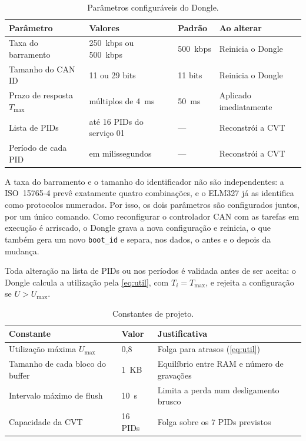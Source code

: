 \documentclass[12pt]{article}
\begin{document}
\begin{table}[htbp]
  \centering
  \caption{Parâmetros configuráveis do Dongle.}
  \label{tab:parametros}
  \begin{tabular}{llll}
    \toprule
    Parâmetro & Valores & Padrão & Ao alterar \\
    \midrule
    Taxa do barramento   & \SI{250}{kbps} ou \SI{500}{kbps} & \SI{500}{kbps} & Reinicia o Dongle \\
    Tamanho do CAN ID    & 11 ou 29 bits                     & 11 bits        & Reinicia o Dongle \\
    Prazo de resposta $T_{\max}$ & múltiplos de \SI{4}{\milli\second} & \SI{50}{\milli\second} & Aplicado imediatamente \\
    Lista de PIDs        & até 16 PIDs do serviço 01         & ---            & Reconstrói a CVT \\
    Período de cada PID  & em milissegundos                  & ---            & Reconstrói a CVT \\
    \bottomrule
  \end{tabular}
\end{table}
 
A taxa do barramento e o tamanho do identificador não são independentes: a ISO~15765-4 prevê exatamente quatro combinações, e o ELM327 já as identifica como protocolos numerados. Por isso, os dois parâmetros são configurados juntos, por um único comando. Como reconfigurar o controlador CAN com as tarefas em execução é arriscado, o Dongle grava a nova configuração e reinicia, o que também gera um novo \texttt{boot\_id} e separa, nos dados, o antes e o depois da mudança.
 
Toda alteração na lista de PIDs ou nos períodos é validada antes de ser aceita: o Dongle calcula a utilização pela \autoref{eq:util}, com $T_i = T_{\max}$, e rejeita a configuração se $U > U_{\max}$.
 
\begin{table}[htbp]
  \centering
  \caption{Constantes de projeto.}
  \label{tab:constantes}
  \begin{tabular}{lll}
    \toprule
    Constante & Valor & Justificativa \\
    \midrule
    Utilização máxima $U_{\max}$ & 0{,}8 & Folga para atrasos (\autoref{eq:util}) \\
    Tamanho de cada bloco do buffer & \SI{1}{KB} & Equilíbrio entre RAM e número de gravações \\
    Intervalo máximo de flush & \SI{10}{\second} & Limita a perda num desligamento brusco \\
    Capacidade da CVT & 16 PIDs & Folga sobre os 7 PIDs previstos \\
    \bottomrule
  \end{tabular}
\end{table}
 
\end{document}
